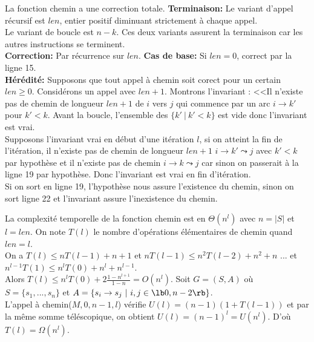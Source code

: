 \documentclass[french, 11pt]{article}
\begin{document}
\begin{prop}{}{}
    La fonction chemin a une correction totale.
    \tcblower
    \textbf{Terminaison:} Le variant d'appel récursif est $len$, entier positif diminuant strictement à chaque appel.\\
    Le variant de boucle est $n-k$. Ces deux variants assurent la terminaison car les autres instructions se terminent.\\
    \textbf{Correction:} Par récurrence sur $len$. \textbf{Cas de base:} Si $len=0$, correct par la ligne 15.\\
    \textbf{Hérédité:} Supposons que tout appel à chemin soit corect pour un certain $len\geq0$. Considérons un appel avec $len+1$. Montrons l'invariant : <<Il n'existe pas de chemin de longueur $len+1$ de $i$ vers $j$ qui commence par un arc $i\to k'$ pour $k'<k$.
    Avant la boucle, l'ensemble des $\{k'~|~k'<k\}$ est vide donc l'invariant est vrai.\\
    Supposons l'invariant vrai en début d'une itération $l$, si on atteint la fin de l'itération, il n'existe pas de chemin de longueur $len+1$ $i\to k'\leadsto j$ avec $k'<k$ par hypothèse et il n'existe pas de chemin $i\to k \leadsto j$ car sinon on passerait à la ligne 19 par hypothèse. Donc l'invariant est vrai en fin d'itération.\\
    Si on sort en ligne 19, l'hypothèse nous assure l'existence du chemin, sinon on sort ligne 22 et l'invariant assure l'inexistence du chemin.
\end{prop}

\vspace*{-0.8cm}

\begin{prop}{}{}
    La complexité temporelle de la fonction chemin est en $\Theta(n^l)$ avec $n=|S|$ et $l=len$.
    \tcblower
    On note $T(l)$ le nombre d'opérations élémentaires de chemin quand $len=l$.\\
    On a $T(l)\leq nT(l-1)+ n + 1$ et $nT(l-1)\leq n^2T(l-2)+n^2 + n$ ... et $n^{l-1}T(1)\leq n^lT(0)+n^l+n^{l-1}$.\\
    Alors $T(l)\leq n^lT(0) + 2\frac{1-n^{l+1}}{1-n}=O(n^l)$. Soit $G=(S,A)$ où $S=\{s_1,...,s_n\}$ et $A=\{s_i\to s_j ~ | ~ i,j\in\lb0,n-2\rb\}$.\\
    L'appel à chemin($M, 0, n-1, l$) vérifie $U(l)=(n-1)(1+T(l-1))$ et par la même somme téléscopique, on obtient $U(l)=(n-1)^l=U(n^l)$. D'où $T(l)=\Omega(n^l)$.
\end{prop}

\vspace*{-1cm}
\end{document}
